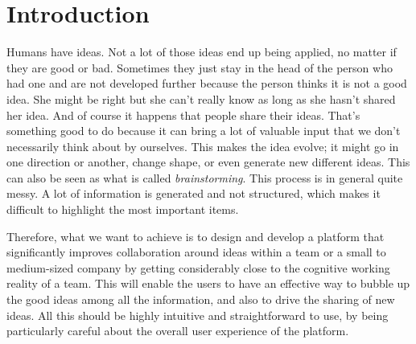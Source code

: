 \documentclass[a4paper,12pt, oneside]{article}
\newenvironment{acknowledgments}
  {\renewcommand{\abstractname}{Acknowledgments}
   \begin{abstract}}
  {\end{abstract}}
\begin{document}



\vspace*{5cm}
\begin{acknowledgments}
    \lipsum[1] %
\end{acknowledgments}
\newpage

\vspace*{5cm}
\begin{abstract}
    \lipsum[1] %
\end{abstract}
\newpage

\tableofcontents
\newpage

\setcounter{page}{1}


\section{Introduction}
Humans have ideas. Not a lot of those ideas end up being applied, no matter if they are good or bad.
Sometimes they just stay in the head of the person who had one and are not developed further because the person thinks it is not a good idea.
She might be right but she can't really know as long as she hasn't shared her idea. And of course it happens that people share their ideas.
That's something good to do because it can bring a lot of valuable input that we don't necessarily think about by ourselves.
This makes the idea evolve; it might go in one direction or another, change shape, or even generate new different ideas.
This can also be seen as what is called \emph{brainstorming}. This process is in general quite messy.
A lot of information is generated and not structured, which makes it difficult to highlight the most important items.

Therefore, what we want to achieve is to design and develop a platform that significantly improves collaboration around ideas within a team or a small to medium-sized company by getting considerably close to the cognitive working reality of a team.
This will enable the users to have an effective way to bubble up the good ideas among all the information, and also to drive the sharing of new ideas. All this should be highly intuitive and straightforward to use, by being particularly careful about the overall user experience of the platform.

\end{document}
